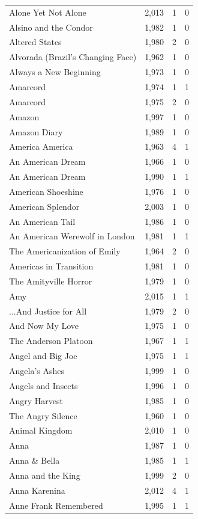 \begin{tabular}{lrrr}
Alone Yet Not Alone & 2,013 & 1 & 0 \\
Alsino and the Condor & 1,982 & 1 & 0 \\
Altered States & 1,980 & 2 & 0 \\
Alvorada (Brazil's Changing Face) & 1,962 & 1 & 0 \\
Always a New Beginning & 1,973 & 1 & 0 \\
Amarcord & 1,974 & 1 & 1 \\
Amarcord & 1,975 & 2 & 0 \\
Amazon & 1,997 & 1 & 0 \\
Amazon Diary & 1,989 & 1 & 0 \\
America America & 1,963 & 4 & 1 \\
An American Dream & 1,966 & 1 & 0 \\
An American Dream & 1,990 & 1 & 1 \\
American Shoeshine & 1,976 & 1 & 0 \\
American Splendor & 2,003 & 1 & 0 \\
An American Tail & 1,986 & 1 & 0 \\
An American Werewolf in London & 1,981 & 1 & 1 \\
The Americanization of Emily & 1,964 & 2 & 0 \\
Americas in Transition & 1,981 & 1 & 0 \\
The Amityville Horror & 1,979 & 1 & 0 \\
Amy & 2,015 & 1 & 1 \\
...And Justice for All & 1,979 & 2 & 0 \\
And Now My Love & 1,975 & 1 & 0 \\
The Anderson Platoon & 1,967 & 1 & 1 \\
Angel and Big Joe & 1,975 & 1 & 1 \\
Angela's Ashes & 1,999 & 1 & 0 \\
Angels and Insects & 1,996 & 1 & 0 \\
Angry Harvest & 1,985 & 1 & 0 \\
The Angry Silence & 1,960 & 1 & 0 \\
Animal Kingdom & 2,010 & 1 & 0 \\
Anna & 1,987 & 1 & 0 \\
Anna \& Bella & 1,985 & 1 & 1 \\
Anna and the King & 1,999 & 2 & 0 \\
Anna Karenina & 2,012 & 4 & 1 \\
Anne Frank Remembered & 1,995 & 1 & 1 \\

\end{tabular}
